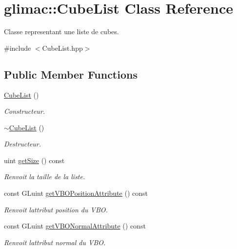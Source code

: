 \hypertarget{classglimac_1_1CubeList}{}\section{glimac\+:\+:Cube\+List Class Reference}
\label{classglimac_1_1CubeList}


Classe representant une liste de cubes.  




{\ttfamily \#include $<$Cube\+List.\+hpp$>$}

\subsection*{Public Member Functions}
\begin{DoxyCompactItemize}
\item 
\hyperlink{classglimac_1_1CubeList_a27f9622967bd19bcb34b3095fbb55ff6}{Cube\+List} ()
\begin{DoxyCompactList}\small\item\em Constructeur. \end{DoxyCompactList}\item 
\hyperlink{classglimac_1_1CubeList_aca9014a89b4f853e301a2821b6d881d9}{$\sim$\+Cube\+List} ()
\begin{DoxyCompactList}\small\item\em Destructeur. \end{DoxyCompactList}\item 
uint \hyperlink{classglimac_1_1CubeList_a9b51810627d160c29da5c319824c4cc7}{get\+Size} () const
\begin{DoxyCompactList}\small\item\em Renvoit la taille de la liste. \end{DoxyCompactList}\item 
const G\+Luint \hyperlink{classglimac_1_1CubeList_a1764c95ba262915ed56bf396f824d3bc}{get\+V\+B\+O\+Position\+Attribute} () const
\begin{DoxyCompactList}\small\item\em Renvoit l\textquotesingle{}attribut position du V\+BO. \end{DoxyCompactList}\item 
const G\+Luint \hyperlink{classglimac_1_1CubeList_a48e789d3c98e4dd5230299d48da5fbb5}{get\+V\+B\+O\+Normal\+Attribute} () const
\begin{DoxyCompactList}\small\item\em Renvoit l\textquotesingle{}attribut normal du V\+BO. \end{DoxyCompactList}\item 

\end{DoxyCompactItemize}
